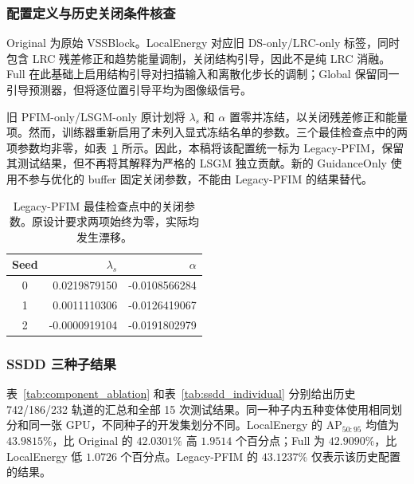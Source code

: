 \documentclass[journal]{IEEEtran}
\begin{document}
\subsubsection{配置定义与历史关闭条件核查}
\label{sec:component_ablation}

Original 为原始 VSSBlock。LocalEnergy 对应旧 DS-only/LRC-only 标签，同时包含 LRC 残差修正和趋势能量调制，关闭结构引导，因此不是纯 LRC 消融。Full 在此基础上启用结构引导对扫描输入和离散化步长的调制；Global 保留同一引导预测器，但将逐位置引导平均为图像级信号。

旧 PFIM-only/LSGM-only 原计划将 $\lambda_s$ 和 $\alpha$ 置零并冻结，以关闭残差修正和能量项。然而，训练器重新启用了未列入显式冻结名单的参数。三个最佳检查点中的两项参数均非零，如表~\ref{tab:freeze_audit} 所示。因此，本稿将该配置统一标为 Legacy-PFIM，保留其测试结果，但不再将其解释为严格的 LSGM 独立贡献。新的 GuidanceOnly 使用不参与优化的 buffer 固定关闭参数，不能由 Legacy-PFIM 的结果替代。

\begin{table}[!t]
\centering
\small
\caption{Legacy-PFIM 最佳检查点中的关闭参数。原设计要求两项始终为零，实际均发生漂移。}
\label{tab:freeze_audit}
\begin{tabular}{crr}
\toprule
Seed & $\lambda_s$ & $\alpha$ \\
\midrule
0 & 0.0219879150 & -0.0108566284 \\
1 & 0.0011110306 & -0.0126419067 \\
2 & -0.0000919104 & -0.0191802979 \\
\bottomrule
\end{tabular}
\end{table}

\subsubsection{SSDD 三种子结果}

表~\ref{tab:component_ablation} 和表~\ref{tab:ssdd_individual} 分别给出历史 742/186/232 轨道的汇总和全部 15 次测试结果。同一种子内五种变体使用相同划分和同一张 GPU，不同种子的开发集划分不同。LocalEnergy 的 $\mathrm{AP}_{50:95}$ 均值为 $43.9815\%$，比 Original 的 $42.0301\%$ 高 $1.9514$ 个百分点；Full 为 $42.9090\%$，比 LocalEnergy 低 $1.0726$ 个百分点。Legacy-PFIM 的 $43.1237\%$ 仅表示该历史配置的结果。
\end{document}
